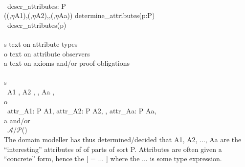 \bp
{} \\
\>\ descr\_attributes: P {\RIGHTARROW} \rsltext\\
\>\>\> (({\UNDERLINE},$\eta$A1),({\UNDERLINE},$\eta$A2),{\DOTDOTDOT},({\UNDERLINE},$\eta$Aa)) {\EQ} determine\_attributes(p:P) \\
\>\ descr\_attributes(p) {\IS}\\
\>\>\>\bq {}\\
\>\>\>\>\>{\LBRACKET}s{\RBRACKET} text on attribute types\\
\>\>\>\>\>{\LBRACKET}o{\RBRACKET} text on attribute observers\\
\>\>\>\>\>{\LBRACKET}a{\RBRACKET} text on axioms and/or proof obligations\\
\>\>\>\ \,\,\\
\>\>\>\>\>{\LBRACKET}s{\RBRACKET}  \\
\>\>\>\>\>\>\>\>\ A1 {\LBRACKET} {\EQ} {\DOTDOTDOT} {\RBRACKET}, A2 {\LBRACKET} {\EQ} {\DOTDOTDOT} {\RBRACKET}, {\DOTDOTDOT}, Aa {\LBRACKET} {\EQ} {\DOTDOTDOT} {\RBRACKET}, \\
\>\>\>\>\>{\LBRACKET}o{\RBRACKET}  \\
\>\>\>\>\>\>\>\>\ attr\_A1: P {\RIGHTARROW} A1, attr\_A2: P {\RIGHTARROW} A2, {\DOTDOTDOT}, attr\_Aa: P {\RIGHTARROW} Aa,\\
\>\>\>\>\>{\LBRACKET}a{\RBRACKET}  and/or \\
\>\>\>\>\>\>\>\>\ $\mathcal{A}$/$\mathcal{P}$({\DOTDOTDOT}) \eq\\
\>\>\>
\ep
\eff
\noindent
\begynd
\pind The domain modeller has thus determined/decided 
\begynd
\pind that \textsf{A1, A2, ..., Aa} are the ``interesting'' attributes of
\pind of parts of sort \textsf{P}.
\afslut
\pind Attributes are often given a ``concrete'' form, hence the \textsf{[ = ... ]} 
\pind where the \textsf{...} is some type expression.
\afslut

